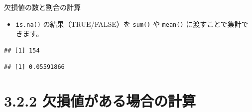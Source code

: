 \documentclass[
  ignorenonframetext,
]{beamer}
\newenvironment{Shaded}{\begin{snugshade}}{\end{snugshade}}
\newcommand{\CommentTok}[1]{\textcolor[rgb]{0.56,0.35,0.01}{\textit{#1}}}
\newcommand{\FunctionTok}[1]{\textcolor[rgb]{0.00,0.00,0.00}{#1}}
\newcommand{\NormalTok}[1]{#1}
\newcommand{\SpecialCharTok}[1]{\textcolor[rgb]{0.00,0.00,0.00}{#1}}
\providecommand{\tightlist}{%
  \setlength{\itemsep}{0pt}\setlength{\parskip}{0pt}}
\begin{document}
\begin{frame}[fragile]{欠損値の数と割合の計算}
\protect\hypertarget{ux6b20ux640dux5024ux306eux6570ux3068ux5272ux5408ux306eux8a08ux7b97}{}
\begin{itemize}
\tightlist
\item
  \texttt{is.na()} の結果（TRUE/FALSE）を \texttt{sum()} や
  \texttt{mean()} に渡すことで集計できます。
\end{itemize}

\scriptsize

\begin{Shaded}
\end{Shaded}

\begin{verbatim}
## [1] 154
\end{verbatim}

\begin{Shaded}
\end{Shaded}

\begin{verbatim}
## [1] 0.05591866
\end{verbatim}

\normalsize
\end{frame}

\hypertarget{ux6b20ux640dux5024ux304cux3042ux308bux5834ux5408ux306eux8a08ux7b97}{%
\section{3.2.2
欠損値がある場合の計算}\label{ux6b20ux640dux5024ux304cux3042ux308bux5834ux5408ux306eux8a08ux7b97}}
\end{document}
